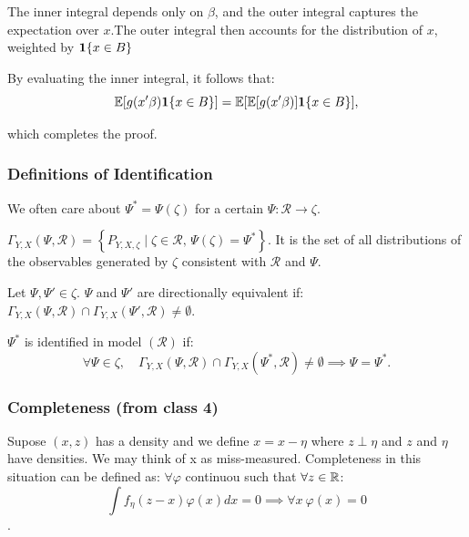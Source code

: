 \documentclass{article}
\begin{document}
\begin{example}
    The inner integral depends only on \(\beta\), and the outer integral captures the expectation over \(x\).The outer integral then accounts for the distribution of \(x\), weighted by \(\mathbf{1} \{x \in B\}\)
    
    By evaluating the inner integral, it follows that:
    \[
    \mathbb{E}[g(x'\beta) \mathbf{1} \{x \in B\}] = \mathbb{E}[\mathbb{E}[g(x'\beta)] \mathbf{1} \{x \in B\}],
    \]
 
    
    which completes the proof.
    \end{example}
    
    
    \subsubsection{Definitions of Identification}

We often care about \( \Psi^* = \Psi(\zeta) \) for a certain \(\Psi : \mathcal{R} \to \zeta\).

\begin{remark}
    \(\Gamma_{Y, X}(\Psi, \mathcal{R}) = \left\{ P_{Y, X, \zeta} \mid \zeta \in \mathcal{R}, \, \Psi(\zeta) = \Psi^* \right\}.
    \) It is the set of all distributions of the observables generated by \(\zeta\) consistent with \(\mathcal{R}\) and \(\Psi\).   

\end{remark} 

\begin{definition}
    Let \(\Psi, \Psi' \in \zeta\). \(\Psi\) and \(\Psi'\) are directionally equivalent if:
    \(
    \Gamma_{Y, X}(\Psi, \mathcal{R}) \cap \Gamma_{Y, X}(\Psi', \mathcal{R}) \neq \emptyset.
    \)
      
\end{definition}


\begin{definition}
   \(\Psi^*\) is identified in model \((\mathcal{R})\) if:
\[
\forall \Psi \in \zeta, \quad \Gamma_{Y, X}(\Psi, \mathcal{R}) \cap \Gamma_{Y, X}(\Psi^*, \mathcal{R}) \neq \emptyset \implies \Psi = \Psi^*.
\] 
\end{definition}

\subsubsection{Completeness (from class 4)}

Supose $(x,z)$ has a density and we define \(x=x-\eta\) where \(z \perp \eta\) and $z$ and $\eta$ have densities. We may think of x as miss-measured. Completeness in this situation can be defined as: \(\forall \varphi\) continuou such that \(\forall z \in \mathbb{R}\): \[\int f_{\eta}(z-x)\varphi(x) dx=0 \implies \forall x \ \varphi(x)=0\]. 
\end{document}
